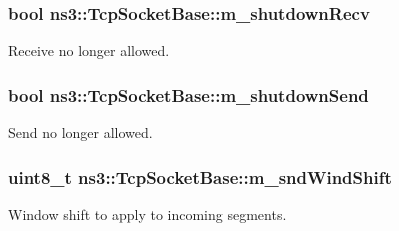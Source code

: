 \subsubsection[{\texorpdfstring{m\+\_\+shutdown\+Recv}{m_shutdownRecv}}]{\setlength{\rightskip}{0pt plus 5cm}bool ns3\+::\+Tcp\+Socket\+Base\+::m\+\_\+shutdown\+Recv\hspace{0.3cm}{\ttfamily [protected]}}\hypertarget{classns3_1_1TcpSocketBase_a946e6fc03360915a21e089f9cd8cf279}{}\label{classns3_1_1TcpSocketBase_a946e6fc03360915a21e089f9cd8cf279}


Receive no longer allowed. 

\subsubsection[{\texorpdfstring{m\+\_\+shutdown\+Send}{m_shutdownSend}}]{\setlength{\rightskip}{0pt plus 5cm}bool ns3\+::\+Tcp\+Socket\+Base\+::m\+\_\+shutdown\+Send\hspace{0.3cm}{\ttfamily [protected]}}\hypertarget{classns3_1_1TcpSocketBase_a443b4ee2b08a845f9429e150d1171a23}{}\label{classns3_1_1TcpSocketBase_a443b4ee2b08a845f9429e150d1171a23}


Send no longer allowed. 

\subsubsection[{\texorpdfstring{m\+\_\+snd\+Wind\+Shift}{m_sndWindShift}}]{\setlength{\rightskip}{0pt plus 5cm}uint8\+\_\+t ns3\+::\+Tcp\+Socket\+Base\+::m\+\_\+snd\+Wind\+Shift\hspace{0.3cm}{\ttfamily [protected]}}\hypertarget{classns3_1_1TcpSocketBase_a249576feb9975ab927aeeda274d9bef0}{}\label{classns3_1_1TcpSocketBase_a249576feb9975ab927aeeda274d9bef0}


Window shift to apply to incoming segments. 

